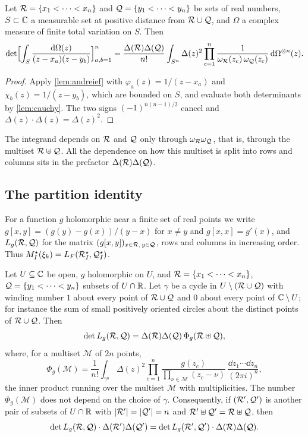 \begin{proposition}\label{prop:det-formula}
Let $\mathcal{R}=\{x_1<\dots<x_n\}$ and $\mathcal{Q}=\{y_1<\dots<y_n\}$ be sets of real numbers, $S\subset\mathbb{C}$
a measurable set at positive distance from $\mathcal{R}\cup\mathcal{Q}$, and $\Omega$ a complex measure of
finite total variation on $S$. Then
\[
  \det\Bigl[\int_S\frac{\mathrm{d}\Omega(z)}{(z-x_a)(z-y_b)}\Bigr]_{a,b=1}^n
  =\frac{\Delta(\mathcal{R})\Delta(\mathcal{Q})}{n!}\int_{S^n}\Delta(z)^2
   \prod_{c=1}^n\frac{1}{\omega_{\mathcal{R}}(z_c)\,\omega_{\mathcal{Q}}(z_c)}\,\mathrm{d}\Omega^{\otimes n}(z).
\]
\end{proposition}

\begin{proof}
Apply \cref{lem:andreief} with $\varphi_a(z)=1/(z-x_a)$ and $\chi_b(z)=1/(z-y_b)$, which are
bounded on $S$, and evaluate both determinants by \cref{lem:cauchy}. The two signs
$(-1)^{n(n-1)/2}$ cancel and $\Delta(z)\cdot\Delta(z)=\Delta(z)^2$.
\end{proof}

The integrand depends on $\mathcal{R}$ and $\mathcal{Q}$ only through $\omega_{\mathcal{R}}\omega_{\mathcal{Q}}$, that is,
through the multiset $\mathcal{R}\uplus\mathcal{Q}$. All the dependence on how this multiset is split into
rows and columns sits in the prefactor $\Delta(\mathcal{R})\Delta(\mathcal{Q})$.

\subsection{The partition identity}\label{subsec:partition}

For a function $g$ holomorphic near a finite set of real points we write
$g[x,y]=(g(y)-g(x))/(y-x)$ for $x\ne y$ and $g[x,x]=g'(x)$, and $L_g(\mathcal{R},\mathcal{Q})$ for the matrix
$(g[x,y])_{x\in\mathcal{R},\,y\in\mathcal{Q}}$, rows and columns in increasing order. Thus
$M^\star_I(\xi_k)=L_F(\mathcal{R}^\star_I,\mathcal{Q}^\star_I)$.

\begin{proposition}\label{prop:partition}
Let $U\subseteq\mathbb{C}$ be open, $g$ holomorphic on $U$, and $\mathcal{R}=\{x_1<\dots<x_n\}$,
$\mathcal{Q}=\{y_1<\dots<y_n\}$ subsets of $U\cap\mathbb{R}$. Let $\gamma$ be a cycle in
$U\setminus(\mathcal{R}\cup\mathcal{Q})$ with winding number $1$ about every point of $\mathcal{R}\cup\mathcal{Q}$ and $0$
about every point of $\mathbb{C}\setminus U$; for instance the sum of small positively oriented circles
about the distinct points of $\mathcal{R}\cup\mathcal{Q}$. Then
\[
  \det L_g(\mathcal{R},\mathcal{Q})=\Delta(\mathcal{R})\Delta(\mathcal{Q})\,\Phi_g(\mathcal{R}\uplus\mathcal{Q}),
\]
where, for a multiset $\mathcal M$ of $2n$ points,
\[
  \Phi_g(\mathcal M)=\frac1{n!}\int_{\gamma^n}\Delta(z)^2\prod_{c=1}^n
  \frac{g(z_c)}{\prod_{\nu\in\mathcal M}(z_c-\nu)}\,\frac{\dd z_1\cdots\dd z_n}{(2\pi i)^n},
\]
the inner product running over the multiset $\mathcal M$ with multiplicities. The number
$\Phi_g(\mathcal M)$ does not depend on the choice of $\gamma$. Consequently, if $(\mathcal{R}',\mathcal{Q}')$ is
another pair of subsets of $U\cap\mathbb{R}$ with $\lvert \mathcal{R}'\rvert=\lvert \mathcal{Q}'\rvert=n$ and
$\mathcal{R}'\uplus\mathcal{Q}'=\mathcal{R}\uplus\mathcal{Q}$, then
\[
  \det L_g(\mathcal{R},\mathcal{Q})\cdot\Delta(\mathcal{R}')\Delta(\mathcal{Q}')=\det L_g(\mathcal{R}',\mathcal{Q}')\cdot\Delta(\mathcal{R})\Delta(\mathcal{Q}).
\]
\end{proposition}

